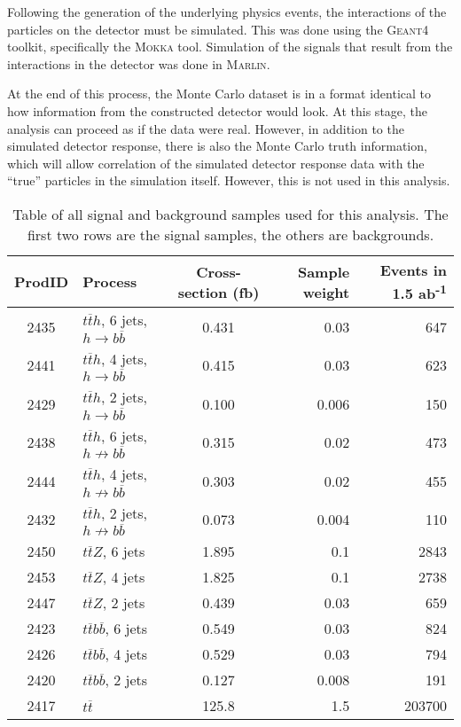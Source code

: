Following the generation of the underlying physics events, the interactions of the particles on the detector must be simulated. This was done using the \textsc{Geant4} toolkit, specifically the \textsc{Mokka} tool. Simulation of the signals that result from the interactions in the detector was done in \textsc{Marlin}.

At the end of this process, the Monte Carlo dataset is in a format identical to how information from the constructed detector would look. At this stage, the analysis can proceed as if the data were real. However, in addition to the simulated detector response, there is also the Monte Carlo truth information, which will allow correlation of the simulated detector response data with the ``true'' particles in the simulation itself. However, this is not used in this analysis.

\begin{table}[htp]
\centering
	\begin{tabular}{ c l c r r }
	\hline \hline
	ProdID & Process & Cross-section (fb) & Sample weight & Events in 1.5 ab\textsuperscript{-1} \\ \hline \hline
	2435 & $t\overline{t}h$, 6 jets, $h \rightarrow b\overline{b}$ & 0.431 & 0.03 & 647 \\
	2441 & $t\overline{t}h$, 4 jets, $h \rightarrow b\overline{b}$ & 0.415 & 0.03 & 623 \\ \hline
	2429 & $t\overline{t}h$, 2 jets, $h \rightarrow b\overline{b}$ & 0.100 & 0.006 & 150 \\

	2438 & $t\overline{t}h$, 6 jets, $h \not\rightarrow b\overline{b}$ & 0.315 & 0.02 & 473	 \\
	2444 & $t\overline{t}h$, 4 jets, $h \not\rightarrow b\overline{b}$ & 0.303 & 0.02 & 455 \\
	2432 & $t\overline{t}h$, 2 jets, $h \not\rightarrow b\overline{b}$ & 0.073 & 0.004 & 110 \\

	2450 & $t\overline{t}Z$, 6 jets & 1.895 & 0.1 & 2843 \\
	2453 & $t\overline{t}Z$, 4 jets & 1.825 & 0.1 & 2738 \\
	2447 & $t\overline{t}Z$, 2 jets & 0.439 & 0.03 & 659 \\
	
	2423 & $t\overline{t}b\overline{b}$, 6 jets & 0.549 & 0.03 & 824 \\
	2426 & $t\overline{t}b\overline{b}$, 4 jets & 0.529 & 0.03 & 794 \\
	2420 & $t\overline{t}b\overline{b}$, 2 jets & 0.127 & 0.008 & 191 \\

	2417 & $t\overline{t}$ & 125.8 & 1.5 & 203700 \\ \hline

	\end{tabular}
	\caption{Table of all signal and background samples used for this analysis. The first two rows are the signal samples, the others are backgrounds.}
	\label{table:physics/SM/generatedsamples}
\end{table}

